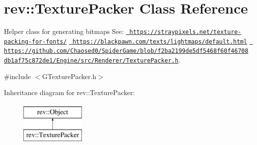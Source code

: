 \hypertarget{classrev_1_1_texture_packer}{}\section{rev\+::Texture\+Packer Class Reference}
\label{classrev_1_1_texture_packer}


Helper class for generating bitmaps See\+: \href{https://straypixels.net/texture-packing-for-fonts/}{\texttt{ https\+://straypixels.\+net/texture-\/packing-\/for-\/fonts/}} \href{https://blackpawn.com/texts/lightmaps/default.html}{\texttt{ https\+://blackpawn.\+com/texts/lightmaps/default.\+html}} \href{https://github.com/Chaosed0/SpiderGame/blob/f2ba2199de5df5468f60f46708db1af75c872de1/Engine/src/Renderer/TexturePacker.h}{\texttt{ https\+://github.\+com/\+Chaosed0/\+Spider\+Game/blob/f2ba2199de5df5468f60f46708db1af75c872de1/\+Engine/src/\+Renderer/\+Texture\+Packer.\+h}}.  




{\ttfamily \#include $<$G\+Texture\+Packer.\+h$>$}

Inheritance diagram for rev\+::Texture\+Packer\+:\begin{figure}[H]
\begin{center}
\leavevmode
\includegraphics[height=2.000000cm]{classrev_1_1_texture_packer}
\end{center}
\end{figure}
